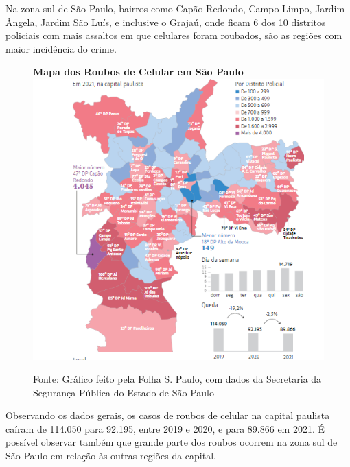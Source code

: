         Na zona sul de São Paulo, bairros como Capão Redondo, Campo Limpo, Jardim Ângela,
        Jardim São Luís, e inclusive o Grajaú, onde ficam 6 dos 10 distritos policiais com
        mais assaltos em que celulares foram roubados, são as regiões com maior incidência
        do crime.

        \begin{figure}[H]
            \centering
            \textbf{Mapa dos Roubos de Celular em São Paulo}
            \includegraphics[scale=0.7]{img/mapa_dos_roubos_de_celular_em_sp.png}
            \caption{Fonte: Gráfico feito pela Folha S. Paulo, com dados da Secretaria da Segurança Pública do Estado de São Paulo}
        \end{figure}

        Observando os dados gerais, os casos de roubos de celular na capital paulista caíram
        de 114.050 para 92.195, entre 2019 e 2020, e para 89.866 em 2021. É possível observar
        também que grande parte dos roubos ocorrem na zona sul de São Paulo em relação às
        outras regiões da capital.

